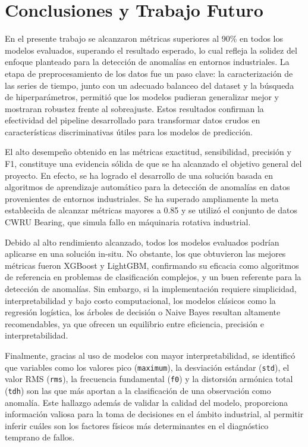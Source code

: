\documentclass[11pt,a4paper,spanish]{book}
\numberwithin{equation}{chapter}
\numberwithin{figure}{chapter}
\begin{document}
\chapter{Conclusiones y Trabajo Futuro}

En el presente  trabajo se alcanzaron métricas superiores al 90\% en todos los modelos
evaluados, superando el resultado esperado, lo cual refleja la solidez del enfoque 
planteado para la detección de anomalías en entornos industriales. La etapa de 
preprocesamiento de los datos fue un paso clave: la caracterización de las series de 
tiempo, junto con un adecuado balanceo del dataset y la búsqueda de hiperparámetros, 
permitió que los modelos pudieran generalizar mejor y mostraran robustez frente al 
sobreajuste. Estos resultados confirman la efectividad del pipeline desarrollado para 
transformar datos crudos en características discriminativas útiles para los modelos 
de predicción.


El alto desempeño obtenido en las métricas exactitud, sensibilidad, precisión y F1, 
constituye una evidencia sólida de que se ha alcanzado el objetivo general del proyecto. 
En efecto, se ha logrado el desarrollo de una solución basada en algoritmos de aprendizaje 
automático para la detección de anomalías en datos provenientes de entornos industriales.
Se ha superado ampliamente la meta establecida de alcanzar métricas mayores a 0.85 y se
utilizó el conjunto de datos CWRU Bearing, que simula fallo en máquinaria rotativa industrial. 


Debido al alto rendimiento alcanzado, todos los modelos evaluados podrían aplicarse en 
una solución in-situ. No obstante, los que obtuvieron las mejores métricas fueron 
XGBoost y LightGBM, confirmando su eficacia como algoritmos de referencia en problemas
de clasificación complejos, y un buen referente para la detección de anomalías. Sin 
embargo, si la implementación requiere simplicidad, interpretabilidad y bajo costo 
computacional, los modelos clásicos como la regresión logística, los árboles de decisión
o Naive Bayes resultan altamente recomendables, ya que ofrecen un equilibrio entre 
eficiencia, precisión e interpretabilidad.


Finalmente, gracias al uso de modelos con mayor interpretabilidad, se identificó que 
variables como los valores pico (\lstinline|maximum|), la desviación estándar 
(\lstinline|std|), el valor RMS (\lstinline|rms|),
la frecuencia fundamental (\lstinline|f0|) y 
la distorsión armónica total (\lstinline|tdh|) son las que más 
aportan a la clasificación de una observación como anomalía. Este hallazgo  además de 
validar la calidad del modelo, proporciona información valiosa para la toma de 
decisiones en el ámbito industrial, al permitir inferir cuáles son los factores físicos
más determinantes en el diagnóstico temprano de fallos.
\end{document}

